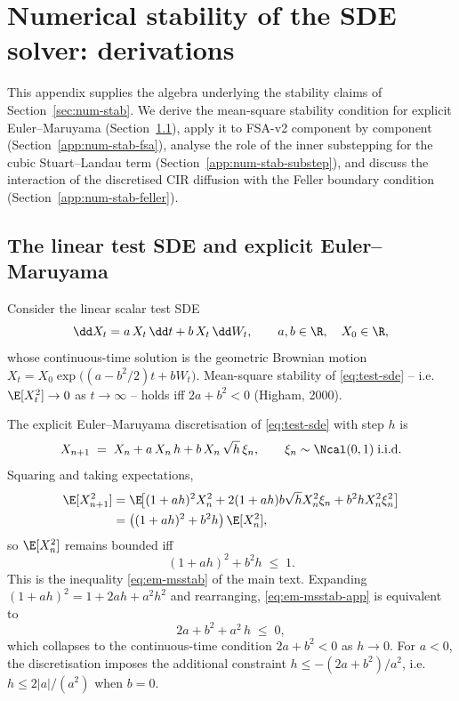 \section{Numerical stability of the SDE solver: derivations}\label{app:num-stab}

This appendix supplies the algebra underlying the stability claims
of Section~\ref{sec:num-stab}. We derive the mean-square stability
condition for explicit Euler--Maruyama
(Section~\ref{app:num-stab-test}), apply it to FSA-v2 component by
component (Section~\ref{app:num-stab-fsa}), analyse the role of the
inner substepping for the cubic Stuart--Landau term
(Section~\ref{app:num-stab-substep}), and discuss the interaction
of the discretised CIR diffusion with the Feller boundary condition
(Section~\ref{app:num-stab-feller}).

\subsection{The linear test SDE and explicit Euler--Maruyama}\label{app:num-stab-test}

Consider the linear scalar test SDE
\begin{equation}
  \dd X_t = a\,X_t\,\dd t + b\,X_t\,\dd W_t,
  \qquad a,b \in \R, \quad X_0 \in \R,
  \label{eq:test-sde}
\end{equation}
whose continuous-time solution is the geometric Brownian motion
$X_t = X_0 \exp\!\bigl((a - b^2/2)t + b W_t\bigr)$. Mean-square
stability of \eqref{eq:test-sde} -- i.e.\ $\E[X_t^2] \to 0$ as
$t \to \infty$ -- holds iff
$2a + b^2 < 0$ (Higham, 2000).

The explicit Euler--Maruyama discretisation of \eqref{eq:test-sde}
with step $h$ is
\begin{equation}
  X_{n+1} \;=\; X_n + a\,X_n\,h + b\,X_n\,\sqrt{h}\,\xi_n,
  \qquad \xi_n \sim \Ncal(0,1)\;\text{i.i.d.}
  \label{eq:em-test}
\end{equation}
Squaring and taking expectations,
\begin{align*}
  \E[X_{n+1}^2]
  &= \E\!\bigl[(1 + a h)^2 X_n^2 + 2(1 + a h) b\sqrt{h} X_n^2 \xi_n + b^2 h X_n^2 \xi_n^2\bigr] \\
  &= \bigl((1 + a h)^2 + b^2 h\bigr)\,\E[X_n^2],
\end{align*}
so $\E[X_n^2]$ remains bounded iff
\begin{equation}
  (1 + a h)^2 + b^2 h \;\le\; 1.
  \label{eq:em-msstab-app}
\end{equation}
This is the inequality \eqref{eq:em-msstab} of the main text.
Expanding $(1 + ah)^2 = 1 + 2ah + a^2 h^2$ and rearranging,
\eqref{eq:em-msstab-app} is equivalent to
\begin{equation}
  2a + b^2 + a^2\,h \;\le\; 0,
  \label{eq:em-msstab-rearranged}
\end{equation}
which collapses to the continuous-time condition
$2a + b^2 < 0$ as $h \to 0$. For $a < 0$, the discretisation
imposes the additional constraint
$h \le -(2a + b^2)/a^2$, i.e.\ $h \le 2|a|/(a^2)$ when $b = 0$.

